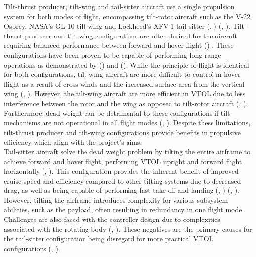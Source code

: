 Tilt-thrust producer, tilt-wing and tail-sitter aircraft use a single propulsion system for both modes of flight, encompassing tilt-rotor aircraft such as the V-22 Osprey, NASA’s GL-10 tilt-wing and Lockheed’s XFV-1 tail-sitter (\citeauthor{hirschberg2006overview}, \citeyear{hirschberg2006overview}) (\citeauthor{rothhaar2014nasa}, \citeyear{rothhaar2014nasa}). Tilt-thrust producer and tilt-wing configurations are often desired for the aircraft requiring balanced performance between forward and hover flight \citeauthor{RN15} (\citeyear{RN15}) . These configurations have been proven to be capable of performing long range operations as demonstrated by \citeauthor{rothhaar2014nasa} (\citeyear{rothhaar2014nasa}) and \citeauthor{Bellv280} (\citeyear{Bellv280}). While the principle of flight is identical for both configurations, tilt-wing aircraft are more difficult to control in hover flight as a result of cross-winds and the increased surface area from the vertical wing (\citeauthor{hirschberg2006overview}, \citeyear{hirschberg2006overview}). However, the tilt-wing aircraft are more efficient in VTOL due to less interference between the rotor and the wing as opposed to tilt-rotor aircraft (\citeauthor{paduano2017system}, \citeyear{paduano2017system}). Furthermore, dead weight can be detrimental to these configurations if tilt-mechanisms are not operational in all flight modes (\citeauthor{RN15}, \citeyear{RN15}). Despite these limitations, tilt-thrust producer and tilt-wing configurations provide benefits in propulsive efficiency which align with the project’s aims. \\

Tail-sitter aircraft solve the dead weight problem by tilting the entire airframe to achieve forward and hover flight, performing VTOL upright and forward flight horizontally (\citeauthor{hirschberg2006overview}, \citeyear{hirschberg2006overview}). This configuration provides the inherent benefit of improved cruise speed and efficiency compared to other tilting systems due to decreased drag, as well as being capable of performing fast take-off and landing (\citeauthor{hirschberg2006overview}, \citeyear{hirschberg2006overview}) (\citeauthor{RN15}, \citeyear{RN15}). However, tilting the airframe introduces complexity for various subsystem abilities, such as the payload, often resulting in redundancy in one flight mode. Challenges are also faced with the controller design due to complexities associated with the rotating body (\citeauthor{hochstenbach2015design}, \citeyear{hochstenbach2015design}). These negatives are the primary causes for the tail-sitter configuration being disregard for more practical VTOL configurations (\citeauthor{RN15}, \citeyear{RN15}). \\

